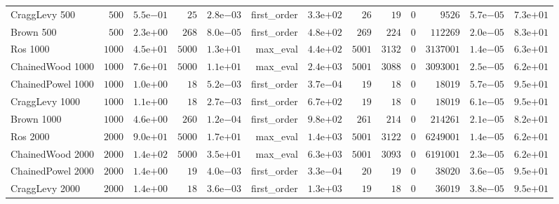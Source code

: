 \begin{longtable}[c]{lrrrrrrrrrrrr}
CraggLevy 500 & \(  500\) & \( 5.5\)e\(-01\) & \(   25\) & \( 2.8\)e\(-03\) & first\_order & \( 3.3\)e\(+02\) & \(   26\) & \(   19\) & \(    0\) & \( 9526\) & \( 5.7\)e\(-05\) & \( 7.3\)e\(+01\) \\
Brown 500 & \(  500\) & \( 2.3\)e\(+00\) & \(  268\) & \( 8.0\)e\(-05\) & first\_order & \( 4.8\)e\(+02\) & \(  269\) & \(  224\) & \(    0\) & \(112269\) & \( 2.0\)e\(-05\) & \( 8.3\)e\(+01\) \\
Ros 1000 & \( 1000\) & \( 4.5\)e\(+01\) & \( 5000\) & \( 1.3\)e\(+01\) & max\_eval & \( 4.4\)e\(+02\) & \( 5001\) & \( 3132\) & \(    0\) & \(3137001\) & \( 1.4\)e\(-05\) & \( 6.3\)e\(+01\) \\
ChainedWood 1000 & \( 1000\) & \( 7.6\)e\(+01\) & \( 5000\) & \( 1.1\)e\(+01\) & max\_eval & \( 2.4\)e\(+03\) & \( 5001\) & \( 3088\) & \(    0\) & \(3093001\) & \( 2.5\)e\(-05\) & \( 6.2\)e\(+01\) \\
ChainedPowel 1000 & \( 1000\) & \( 1.0\)e\(+00\) & \(   18\) & \( 5.2\)e\(-03\) & first\_order & \( 3.7\)e\(-04\) & \(   19\) & \(   18\) & \(    0\) & \(18019\) & \( 5.7\)e\(-05\) & \( 9.5\)e\(+01\) \\
CraggLevy 1000 & \( 1000\) & \( 1.1\)e\(+00\) & \(   18\) & \( 2.7\)e\(-03\) & first\_order & \( 6.7\)e\(+02\) & \(   19\) & \(   18\) & \(    0\) & \(18019\) & \( 6.1\)e\(-05\) & \( 9.5\)e\(+01\) \\
Brown 1000 & \( 1000\) & \( 4.6\)e\(+00\) & \(  260\) & \( 1.2\)e\(-04\) & first\_order & \( 9.8\)e\(+02\) & \(  261\) & \(  214\) & \(    0\) & \(214261\) & \( 2.1\)e\(-05\) & \( 8.2\)e\(+01\) \\
Ros 2000 & \( 2000\) & \( 9.0\)e\(+01\) & \( 5000\) & \( 1.7\)e\(+01\) & max\_eval & \( 1.4\)e\(+03\) & \( 5001\) & \( 3122\) & \(    0\) & \(6249001\) & \( 1.4\)e\(-05\) & \( 6.2\)e\(+01\) \\
ChainedWood 2000 & \( 2000\) & \( 1.4\)e\(+02\) & \( 5000\) & \( 3.5\)e\(+01\) & max\_eval & \( 6.3\)e\(+03\) & \( 5001\) & \( 3093\) & \(    0\) & \(6191001\) & \( 2.3\)e\(-05\) & \( 6.2\)e\(+01\) \\
ChainedPowel 2000 & \( 2000\) & \( 1.4\)e\(+00\) & \(   19\) & \( 4.0\)e\(-03\) & first\_order & \( 3.3\)e\(-04\) & \(   20\) & \(   19\) & \(    0\) & \(38020\) & \( 3.6\)e\(-05\) & \( 9.5\)e\(+01\) \\
CraggLevy 2000 & \( 2000\) & \( 1.4\)e\(+00\) & \(   18\) & \( 3.6\)e\(-03\) & first\_order & \( 1.3\)e\(+03\) & \(   19\) & \(   18\) & \(    0\) & \(36019\) & \( 3.8\)e\(-05\) & \( 9.5\)e\(+01\) \\

\end{longtable}
